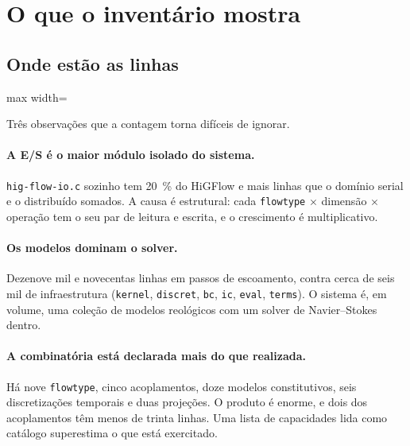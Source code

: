 \section{O que o invent\'ario mostra}

\subsection{Onde est\~ao as linhas}

\begin{adjustbox}{max width=\linewidth}
\end{adjustbox}

Tr\^es observa\c{c}\~oes que a contagem torna dif\'iceis de ignorar.

\paragraph{A E/S \'e o maior m\'odulo isolado do sistema.} \texttt{hig-flow-io.c}
sozinho tem \SI{20}{\percent} do HiGFlow e mais linhas que o dom\'inio serial e o
distribu\'ido somados. A causa \'e estrutural: cada \texttt{flowtype} $\times$
dimens\~ao $\times$ opera\c{c}\~ao tem o seu par de leitura e escrita, e o
crescimento \'e multiplicativo.

\paragraph{Os modelos dominam o solver.} Dezenove mil e novecentas linhas em
passos de escoamento, contra cerca de seis mil de infraestrutura (\texttt{kernel},
\texttt{discret}, \texttt{bc}, \texttt{ic}, \texttt{eval}, \texttt{terms}). O
sistema \'e, em volume, uma cole\c{c}\~ao de modelos reol\'ogicos com um solver
de Navier--Stokes dentro.

\paragraph{A combinat\'oria est\'a declarada mais do que realizada.} H\'a nove
\texttt{flowtype}, cinco acoplamentos, doze modelos constitutivos, seis
discretiza\c{c}\~oes temporais e duas proje\c{c}\~oes. O produto \'e enorme, e
dois dos acoplamentos t\^em menos de trinta linhas. Uma lista de capacidades
lida como cat\'alogo superestima o que est\'a exercitado.

